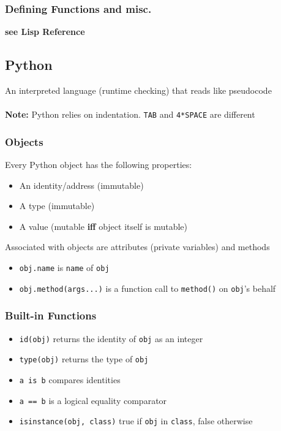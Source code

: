 \documentclass[13pt]{article}
\begin{document}
      \subsubsection{Defining Functions and misc.}
      \textbf{see Lisp Reference}

      \subsection{Python}
      An interpreted language (runtime checking) that reads like pseudocode \\ \\
      \textbf{Note:} Python relies on indentation. \texttt{TAB} and \texttt{4*SPACE} are different

      \subsubsection{Objects}
      Every Python object has the following properties:
      \begin{itemize}[leftmargin = 0pt]
      \item [] An identity/address (immutable)
      \item [] A type (immutable)
      \item [] A value (mutable \textbf{iff} object itself is mutable)
      \end{itemize}
      Associated with objects are attributes (private variables) and methods
      \begin{itemize}[leftmargin = 0pt]
      \item [] \texttt{obj.name} is \texttt{name} of \texttt{obj}
      \item [] \texttt{obj.method(args...)} is a function call to \texttt{method()} on \texttt{obj}'s behalf
      \end{itemize}

      \subsubsection{Built-in Functions}
      \begin{itemize}[leftmargin = 0pt]
      \item [] \texttt{id(obj)} returns the identity of \texttt{obj} as an integer
      \item [] \texttt{type(obj)} returns the type of \texttt{obj}
      \item [] \texttt{a is b} compares identities
      \item [] \texttt{a == b} is a logical equality comparator
      \item [] \texttt{isinstance(obj, class)} true if \texttt{obj} in \texttt{class}, false otherwise
      \end{itemize}
\end{document}

